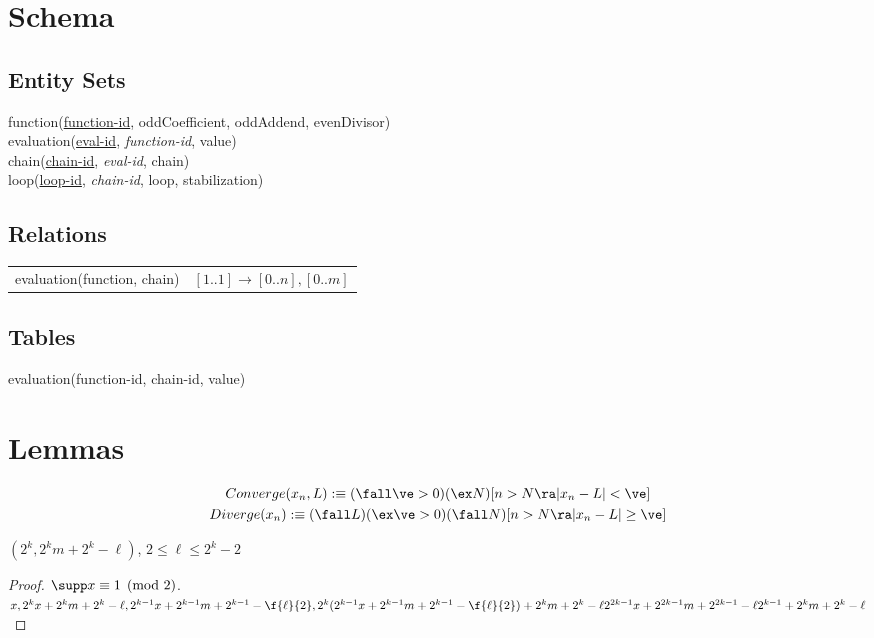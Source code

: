 \documentclass[12pt]{article}
\begin{document}
    \tableofcontents
    \newpage

    \section{Schema}
    \subsection{Entity Sets}
    function(\ul{function-id}, oddCoefficient, oddAddend, evenDivisor) \\
    evaluation(\ul{eval-id}, \textit{function-id}, value) \\
    chain(\ul{chain-id}, \textit{eval-id}, chain) \\
    loop(\ul{loop-id}, \textit{chain-id}, loop, stabilization)

    \subsection{Relations}
    \begin{tabular}{l|l}
        evaluation(function, chain) & $[1..1] \to [0..n],[0..m]$ \\
    \end{tabular}

    \subsection{Tables}
    evaluation(function-id, chain-id, value)

    \newpage
    \section{Lemmas}
    \begin{gather*}
        Converge(x_n, L) :\equiv
        (\fall \ve > 0)(\ex N)[n > N \ra |x_n - L| < \ve] \\
        Diverge(x_n) :\equiv
        (\fall L)(\ex \ve > 0)(\fall N)[n > N \ra |x_n - L| \ge \ve] \\
    \end{gather*}

    \begin{lemma}
        $(2^k, 2^km + 2^k - \ell)$, $2 \le \ell \le 2^k - 2$
    \end{lemma}
    \begin{proof}
        $\supp x \equiv 1 \pmod 2$. \\
        $x, \\
        2^kx + 2^km + 2^k - \ell, \\
        2^{k - 1}x + 2^{k - 1}m + 2^{k - 1} - \f{\ell}{2}, \\
        2^k(2^{k - 1}x + 2^{k - 1}m + 2^{k - 1} - \f{\ell}{2}) + 2^km + 2^k - \ell \\
        2^{2k - 1}x + 2^{2k - 1}m + 2^{2k - 1} - \ell 2^{k - 1} + 2^km + 2^k - \ell$
    \end{proof}
\end{document}
